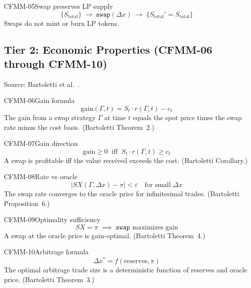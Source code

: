 \begin{invariant}{CFMM-05}{Swap preserves LP supply}
\[
  \{S_{\text{total}}\} \;\longrightarrow\; \texttt{swap}(\Delta x)
  \;\longrightarrow\; \{S_{\text{total}}' = S_{\text{total}}\}
\]
Swaps do not mint or burn LP tokens.
\end{invariant}

\subsection{Tier 2: Economic Properties (CFMM-06 through CFMM-10)}

Source: Bartoletti et al.\ \cite{bartoletti2024formalizing}.

\begin{invariant}{CFMM-06}{Gain formula}
\[
  \text{gain}(\Gamma, t) = S_t \cdot r(\Gamma, t) - c_t
\]
The gain from a swap strategy $\Gamma$ at time $t$ equals the spot price times
the swap rate minus the cost basis. (Bartoletti Theorem~2.)
\end{invariant}

\begin{invariant}{CFMM-07}{Gain direction}
\[
  \text{gain} \geq 0 \;\;\text{iff}\;\; S_t \cdot r(\Gamma, t) \geq c_t
\]
A swap is profitable iff the value received exceeds the cost. (Bartoletti Corollary.)
\end{invariant}

\begin{invariant}{CFMM-08}{Rate vs oracle}
\[
  |SX(\Gamma, \Delta x) - \pi| < \varepsilon \quad \text{for small } \Delta x
\]
The swap rate converges to the oracle price for infinitesimal trades.
(Bartoletti Proposition~6.)
\end{invariant}

\begin{invariant}{CFMM-09}{Optimality sufficiency}
\[
  SX = \pi \;\implies\; \texttt{swap} \text{ maximizes gain}
\]
A swap at the oracle price is gain-optimal. (Bartoletti Theorem~4.)
\end{invariant}

\begin{invariant}{CFMM-10}{Arbitrage formula}
\[
  \Delta x^* = f(\text{reserves}, \pi)
\]
The optimal arbitrage trade size is a deterministic function of reserves and
oracle price. (Bartoletti Theorem~3.)
\end{invariant}

